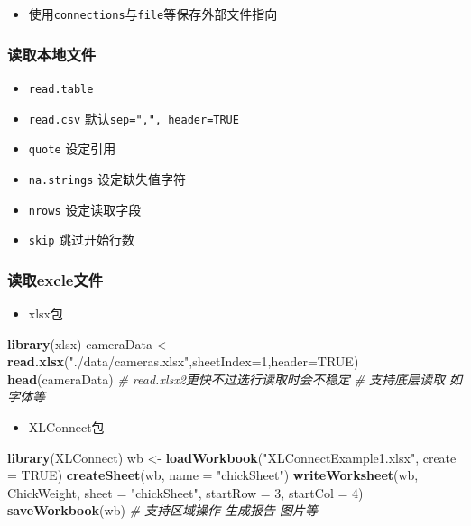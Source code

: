 \documentclass[]{book}
\newenvironment{Shaded}{\begin{snugshade}}{\end{snugshade}}
\newcommand{\CommentTok}[1]{\textcolor[rgb]{0.56,0.35,0.01}{\textit{#1}}}
\newcommand{\DataTypeTok}[1]{\textcolor[rgb]{0.13,0.29,0.53}{#1}}
\newcommand{\DecValTok}[1]{\textcolor[rgb]{0.00,0.00,0.81}{#1}}
\newcommand{\KeywordTok}[1]{\textcolor[rgb]{0.13,0.29,0.53}{\textbf{#1}}}
\newcommand{\NormalTok}[1]{#1}
\newcommand{\OtherTok}[1]{\textcolor[rgb]{0.56,0.35,0.01}{#1}}
\newcommand{\StringTok}[1]{\textcolor[rgb]{0.31,0.60,0.02}{#1}}
\providecommand{\tightlist}{%
  \setlength{\itemsep}{0pt}\setlength{\parskip}{0pt}}
\begin{document}
\begin{itemize}
\tightlist
\item
  使用\texttt{connections}与\texttt{file}等保存外部文件指向
\end{itemize}

\subsubsection{读取本地文件}

\begin{itemize}
\tightlist
\item
  \texttt{read.table}
\item
  \texttt{read.csv} 默认\texttt{sep=",",\ header=TRUE}
\item
  \texttt{quote} 设定引用
\item
  \texttt{na.strings} 设定缺失值字符
\item
  \texttt{nrows} 设定读取字段
\item
  \texttt{skip} 跳过开始行数
\end{itemize}

\hypertarget{excle}{%
\subsubsection{读取excle文件}\label{excle}}

\begin{itemize}
\tightlist
\item
  xlsx包
\end{itemize}

\begin{Shaded}
\begin{Highlighting}[]
\KeywordTok{library}\NormalTok{(xlsx)}
\NormalTok{cameraData <-}\StringTok{ }\KeywordTok{read.xlsx}\NormalTok{(}\StringTok{"./data/cameras.xlsx"}\NormalTok{,}\DataTypeTok{sheetIndex=}\DecValTok{1}\NormalTok{,}\DataTypeTok{header=}\OtherTok{TRUE}\NormalTok{)}
\KeywordTok{head}\NormalTok{(cameraData)}
\CommentTok{# read.xlsx2更快不过选行读取时会不稳定}
\CommentTok{# 支持底层读取 如字体等}
\end{Highlighting}
\end{Shaded}

\begin{itemize}
\tightlist
\item
  XLConnect包
\end{itemize}

\begin{Shaded}
\begin{Highlighting}[]
\KeywordTok{library}\NormalTok{(XLConnect)}
\NormalTok{wb <-}\StringTok{ }\KeywordTok{loadWorkbook}\NormalTok{(}\StringTok{"XLConnectExample1.xlsx"}\NormalTok{, }\DataTypeTok{create =} \OtherTok{TRUE}\NormalTok{)}
\KeywordTok{createSheet}\NormalTok{(wb, }\DataTypeTok{name =} \StringTok{"chickSheet"}\NormalTok{)}
\KeywordTok{writeWorksheet}\NormalTok{(wb, ChickWeight, }\DataTypeTok{sheet =} \StringTok{"chickSheet"}\NormalTok{, }\DataTypeTok{startRow =} \DecValTok{3}\NormalTok{, }\DataTypeTok{startCol =} \DecValTok{4}\NormalTok{)}
\KeywordTok{saveWorkbook}\NormalTok{(wb)}
\CommentTok{# 支持区域操作 生成报告 图片等}
\end{Highlighting}
\end{Shaded}
\end{document}
